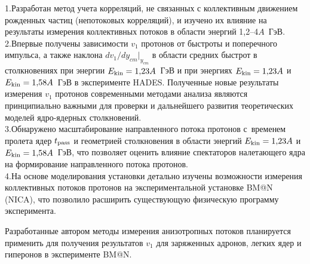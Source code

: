 ﻿%
1.\;Разработан метод учета корреляций, не связанных с коллективным
движением рожденных частиц (непотоковых корреляций), и изучено их влияние на результаты измерения коллективных потоков в области энергий 1,2--4$A$~ГэВ. \\
2.\;Впервые получены зависимости  $v_1$ протонов от быстроты и поперечного импульса, а также наклона $dv_1/dy_{cm}|_{y_{cm}}$ в 
  области средних быстрот в столкновениях \au{} при  энергии  $E_{\rm kin}=1{,}23A$~ГэВ и \ag{} 
  при энергиях $E_{\rm kin}=1{,}23A$ и $E_{\rm kin}=1{,}58A$~ГэВ в эксперименте HADES. Полученные новые результаты измерения $v_1$ протонов современными методами 
  анализа являются принципиально важными для проверки и
дальнейшего развития теоретических моделей ядро-ядерных столкновений.\\
3.\;Обнаружено масштабирование направленного потока протонов с~временем пролета ядер $t_{\rm pass}$ и геометрией столкновения в области
   энергий $E_{\rm kin}=1{,}23A$ и $E_{\rm kin}=1{,}58A$~ГэВ, что позволяет оценить влияние спектаторов налетающего ядра на
формирование направленного потока протонов.\\
4.\;На основе моделирования установки детально изучены возможности измерения коллективных потоков протонов на экспериментальной установке BM@N (NICA), что позволило расширить существующую физическую программу эксперимента.

Разработанные автором методы измерения анизотропных потоков планируется применить для получения результатов $v_1$ для заряженных адронов, легких ядер и гиперонов в эксперименте BM@N. 